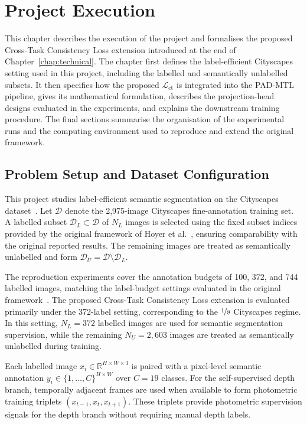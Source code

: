 \chapter{Project Execution}
\label{chap:execution}

This chapter describes the execution of the project and formalises the
proposed Cross-Task Consistency Loss extension introduced at the end of
Chapter~\ref{chap:technical}. The chapter first defines the
label-efficient Cityscapes setting used in this project, including the
labelled and semantically unlabelled subsets. It then specifies how the
proposed $\mathcal{L}_\text{ct}$ is integrated into the PAD-MTL pipeline,
gives its mathematical formulation, describes the projection-head designs
evaluated in the experiments, and explains the downstream training
procedure. The final sections summarise the organisation of the
experimental runs and the computing environment used to reproduce and
extend the original framework.

\section{Problem Setup and Dataset Configuration}
\label{sec:problem-setup}

This project studies label-efficient semantic segmentation on the
Cityscapes dataset~\cite{cordts2016cityscapes}. Let $\mathcal{D}$ denote
the 2,975-image Cityscapes fine-annotation training set. A labelled subset
$\mathcal{D}_L \subset \mathcal{D}$ of $N_L$ images is selected using the
fixed subset indices provided by the original framework of
Hoyer et al.~\cite{hoyer2023improving}, ensuring comparability with the
original reported results. The remaining images are treated as
semantically unlabelled and form
$\mathcal{D}_U = \mathcal{D} \setminus \mathcal{D}_L$.

The reproduction experiments cover the annotation budgets of 100, 372, and
744 labelled images, matching the label-budget settings evaluated in the
original framework~\cite{hoyer2023improving}. The proposed Cross-Task
Consistency Loss extension is evaluated primarily under the 372-label
setting, corresponding to the $\nicefrac{1}{8}$ Cityscapes regime. In this
setting, $N_L = 372$ labelled images are used for semantic segmentation
supervision, while the remaining $N_U = 2{,}603$ images are treated as
semantically unlabelled during training.

Each labelled image $x_i \in \mathbb{R}^{H \times W \times 3}$ is paired
with a pixel-level semantic annotation
$y_i \in \{1,\ldots,C\}^{H \times W}$ over $C=19$ classes. For the
self-supervised depth branch, temporally adjacent frames are used when
available to form photometric training triplets
$(x_{t-1}, x_t, x_{t+1})$. These triplets provide photometric supervision
signals for the depth branch without requiring manual depth labels.

